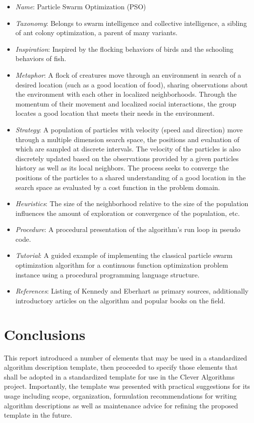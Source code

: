 \documentclass[a4paper, 11pt]{article}
\begin{document}
\begin{itemize}
	\item \emph{Name}: Particle Swarm Optimization (PSO)
	\item \emph{Taxonomy}: Belongs to swarm intelligence and collective intelligence, a sibling of ant colony optimization, a parent of many variants.
	\item \emph{Inspiration}: Inspired by the flocking behaviors of birds and the schooling behaviors of fish.
	\item \emph{Metaphor}: A flock of creatures move through an environment in search of a desired location (such as a good location of food), sharing observations about the environment with each other in localized neighborhoods. Through the momentum of their movement and localized social interactions, the group locates a good location that meets their needs in the environment. 
	\item \emph{Strategy}: A population of particles with velocity (speed and direction) move through a multiple dimension search space, the positions and evaluation of which are sampled at discrete intervals. The velocity of the particles is also discretely updated based on the observations provided by a given particles history as well as its local neighbors. The process seeks to converge the positions of the particles to a shared understanding of a good location in the search space as evaluated by a cost function in the problem domain.
	\item \emph{Heuristics}: The size of the neighborhood relative to the size of the population influences the amount of exploration or convergence of the population, etc.
	\item \emph{Procedure}: A procedural presentation of the algorithm's run loop in pseudo code.
	\item \emph{Tutorial}: A guided example of implementing the classical particle swarm optimization algorithm for a continuous function optimization problem instance using a procedural programming language structure.
	\item \emph{References}: Listing of Kennedy and Eberhart as primary sources, additionally introductory articles on the algorithm and popular books on the field.
\end{itemize}

\section{Conclusions}
\label{sec:conclusions}
This report introduced a number of elements that may be used in a standardized algorithm description template, then proceeded to specify those elements that shall be adopted in a standardized template for use in the Clever Algorithms project. Importantly, the template was presented with practical suggestions for its usage including scope, organization, formulation recommendations for writing algorithm descriptions as well as maintenance advice for refining the proposed template in the future.
\end{document}
